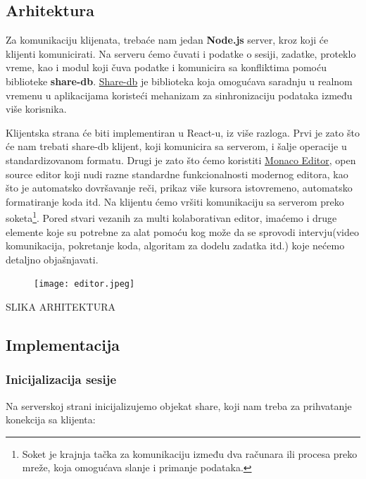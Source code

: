 \documentclass[12pt]{article}
\begin{document}
\subsection{Arhitektura}

Za komunikaciju klijenata, trebaće nam jedan \textbf{Node.js} server, kroz koji će klijenti komunicirati. Na serveru ćemo čuvati i podatke o sesiji, zadatke, proteklo vreme, kao i modul koji čuva podatke i komunicira sa konfliktima pomoću biblioteke \textbf{share-db}. \href{https://share.github.io/sharedb/}{Share-db} je biblioteka koja omogućava saradnju u realnom vremenu u aplikacijama koristeći mehanizam za sinhronizaciju podataka između više korisnika. 

Klijentska strana će biti implementiran u React-u, iz više razloga. Prvi je zato što će nam trebati share-db klijent, koji komunicira sa serverom, i šalje operacije u standardizovanom formatu. Drugi je zato što ćemo koristiti \href{https://microsoft.github.io/monaco-editor/}{Monaco Editor}, open source editor koji nudi razne standardne funkcionalnosti modernog editora, kao što je automatsko dovršavanje reči, prikaz više kursora istovremeno, automatsko formatiranje koda itd. Na klijentu ćemo vršiti komunikaciju sa serverom preko soketa\footnote{Soket je krajnja tačka za komunikaciju između dva računara ili procesa preko mreže, koja omogućava slanje i primanje podataka.}. Pored stvari vezanih za multi kolaborativan editor, imaćemo i druge elemente koje su potrebne za alat pomoću kog može da se sprovodi intervju(video komunikacija, pokretanje koda, algoritam za dodelu zadatka itd.) koje nećemo detaljno objašnjavati.

\begin{figure}[H]
	\centering
	\texttt{[image: editor.jpeg]}
	\label{fig:nls_demo}
\end{figure}
SLIKA ARHITEKTURA

\subsection{Implementacija}

\subsubsection{Inicijalizacija sesije}

Na serverskoj strani inicijalizujemo objekat share, koji nam treba za prihvatanje konekcija sa klijenta:
\end{document}
